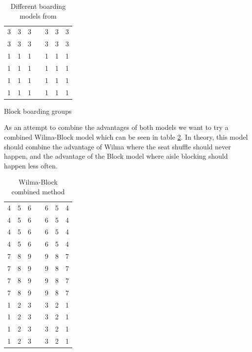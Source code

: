 \documentclass[english]{article}
\begin{document}
\begin{table}[H]
\begin{subtable}[h]{0.45\textwidth}
\begin{tabular}{|c c c|c|c c c|}
        3 & 3 & 3 & \cellcolor{lightgray} & 3 & 3 & 3 \\
        3 & 3 & 3 & \cellcolor{lightgray} & 3 & 3 & 3 \\
        \hline
        1 & 1 & 1 & \cellcolor{lightgray} & 1 & 1 & 1 \\
        1 & 1 & 1 & \cellcolor{lightgray} & 1 & 1 & 1 \\
        1 & 1 & 1 & \cellcolor{lightgray} & 1 & 1 & 1 \\
        1 & 1 & 1 & \cellcolor{lightgray} & 1 & 1 & 1 \\
    \hline
    \end{tabular}
        \caption{Block boarding groups}
        \label{tab:block_group}
     \end{subtable}
     \caption{Different boarding models from\cite{STEFFEN201264} }
     \label{tab:paper_methods}
\end{table}

As an attempt to combine the advantages of both models we want to try a combined Wilma-Block model which can be seen in table \ref{tab:wilmablock_group}. In theory, this model should combine the advantage of Wilma where the seat shuffle should never happen, and the advantage of the Block model where aisle blocking should happen less often.  

\begin{table}[H]
    \centering
        \begin{tabular}{|c|c|c|c|c|c|c|}
    \hline
    \rowcolor{lightgray}\multicolumn{7}{|c|}{front}\\
    \hline
        4 & 5 & 6 & \cellcolor{lightgray} & 6 & 5 & 4 \\
        4 & 5 & 6 & \cellcolor{lightgray} & 6 & 5 & 4 \\
        4 & 5 & 6 & \cellcolor{lightgray} & 6 & 5 & 4 \\
        4 & 5 & 6 & \cellcolor{lightgray} & 6 & 5 & 4 \\
        \hline
        7 & 8 & 9 & \cellcolor{lightgray} & 9 & 8 & 7 \\
        7 & 8 & 9 & \cellcolor{lightgray} & 9 & 8 & 7 \\
        7 & 8 & 9 & \cellcolor{lightgray} & 9 & 8 & 7 \\
        7 & 8 & 9 & \cellcolor{lightgray} & 9 & 8 & 7 \\
        \hline
        1 & 2 & 3 & \cellcolor{lightgray} & 3 & 2 & 1 \\
        1 & 2 & 3 & \cellcolor{lightgray} & 3 & 2 & 1 \\
        1 & 2 & 3 & \cellcolor{lightgray} & 3 & 2 & 1 \\
        1 & 2 & 3 & \cellcolor{lightgray} & 3 & 2 & 1 \\
    \hline
    \end{tabular}
    \caption{Wilma-Block combined method}
    \label{tab:wilmablock_group}
\end{table}
\end{document}
